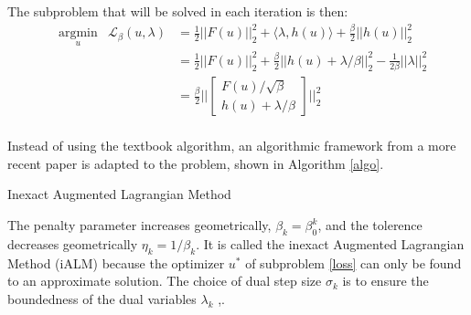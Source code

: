 The subproblem that will be solved in each iteration is then:
\begin{equation}
	\begin{aligned}
	 & \underset{u}{\text{argmin}} & \mathcal{L}_{\beta}(u,\lambda) 
	     &= \frac{1}{2} ||F(u)||^2_2 + \langle\lambda,h(u)\rangle + \frac{\beta}{2} || h(u) ||^2_2 \\
	 & & &= \frac{1}{2} ||F(u)||^2_2 + \frac{\beta}{2} ||h(u) + \lambda/\beta ||^2_2 - \frac{1}{2\beta} ||\lambda||^2_2 \\
	 & & &= \frac{\beta}{2} \Big|\Big|
		\begin{bmatrix}
			F(u)/\sqrt{\beta} \\
			h(u) + \lambda/\beta
		\end{bmatrix} \Big|\Big|^2_2 \\
	\end{aligned}
	\label{loss}
\end{equation}

Instead of using the textbook algorithm, an algorithmic framework from a more recent paper\cite{sahin2019} is adapted to the problem, shown in Algorithm \ref{algo}.

\begin{algorithm}[H]
\SetAlgoLined
{}
 \caption{Inexact Augmented Lagrangian Method}
 \label{algo}
\end{algorithm}
The penalty parameter increases geometrically, $\beta_k = \beta_0^k$, and the tolerence decreases geometrically $\eta_k = 1/\beta_k$. It is called the inexact Augmented Lagrangian Method (iALM) because the optimizer $u^*$ of subproblem \ref{loss} can only be found to an approximate solution.  The choice of dual step size $\sigma_k$ is to ensure the boundedness of the dual variables $\lambda_k$ \cite{sahin2019},\cite{bertsekas1976}. 


